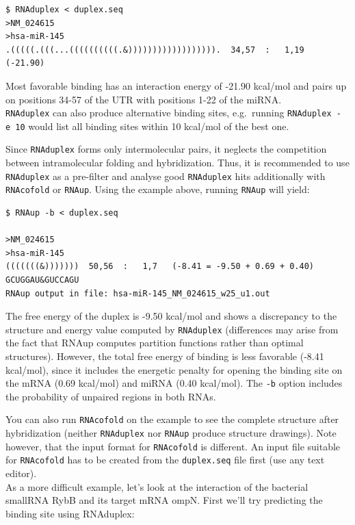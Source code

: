 \documentclass[]{article}
\begin{document}
\begin{verbatim}
$ RNAduplex < duplex.seq
>NM_024615
>hsa-miR-145
.(((((.(((...((((((((((.&)))))))))))))))))).  34,57  :   1,19  (-21.90)
\end{verbatim}

Most favorable binding has an interaction energy of -21.90 kcal/mol and
pairs up on positions 34-57 of the UTR with positions 1-22 of the
miRNA.\\
 \texttt{RNAduplex} can also produce alternative binding sites,
e.g.~running \texttt{RNAduplex\ -e\ 10} would list all binding sites
within 10 kcal/mol of the best one.

Since \texttt{RNAduplex} forms only intermolecular pairs, it neglects
the competition between intramolecular folding and hybridization. Thus,
it is recommended to use \texttt{RNAduplex} as a pre-filter and analyse
good \texttt{RNAduplex} hits additionally with \texttt{RNAcofold} or
\texttt{RNAup}. Using the example above, running \texttt{RNAup} will
yield:

\begin{verbatim}
$ RNAup -b < duplex.seq

>NM_024615
>hsa-miR-145
(((((((&)))))))  50,56  :   1,7   (-8.41 = -9.50 + 0.69 + 0.40)
GCUGGAU&GUCCAGU
RNAup output in file: hsa-miR-145_NM_024615_w25_u1.out
\end{verbatim}

The free energy of the duplex is -9.50 kcal/mol and shows a discrepancy
to the structure and energy value computed by \texttt{RNAduplex}
(differences may arise from the fact that RNAup computes partition
functions rather than optimal structures). However, the total free
energy of binding is less favorable (-8.41 kcal/mol), since it includes
the energetic penalty for opening the binding site on the mRNA (0.69
kcal/mol) and miRNA (0.40 kcal/mol). The \texttt{-b} option includes the
probability of unpaired regions in both RNAs.

You can also run \texttt{RNAcofold} on the example to see the complete
structure after hybridization (neither \texttt{RNAduplex} nor
\texttt{RNAup} produce structure drawings). Note however, that the input
format for \texttt{RNAcofold} is different. An input file suitable for
\texttt{RNAcofold} has to be created from the \texttt{duplex.seq} file
first (use any text editor).\\
 As a more difficult example, let's look at the interaction of the
bacterial smallRNA RybB and its target mRNA ompN. First we'll try
predicting the binding site using RNAduplex:
\end{document}
